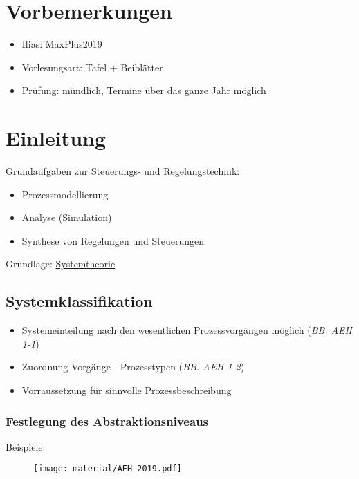 \section*{Vorbemerkungen}
\begin{itemize}
	\item Ilias: MaxPlus2019
	\item Vorlesungsart: Tafel + Beiblätter
	\item Prüfung: mündlich, Termine über das ganze Jahr möglich
\end{itemize}

\section{Einleitung}
Grundaufgaben zur Steuerungs- und Regelungstechnik:
\begin{itemize}
	\item Prozessmodellierung
	\item Analyse (Simulation)
	\item Synthese von Regelungen und Steuerungen 
\end{itemize}
Grundlage: \underline{Systemtheorie}

\subsection{Systemklassifikation}
\begin{itemize}
	\item Systemeinteilung nach den wesentlichen Prozessvorgängen möglich (\textit{BB. AEH 1-1})
	\item Zuordnung Vorgänge - Prozesstypen (\textit{BB. AEH 1-2})
	\item Vorraussetzung für sinnvolle Prozessbeschreibung
\end{itemize}




\subsubsection{Festlegung des Abstraktionsniveaus}
Beispiele:


\begin{figure}[H]
	\centering
	\texttt{[image: material/AEH\_2019.pdf]}
\end{figure}

